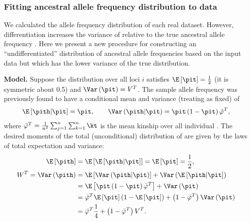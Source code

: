 \documentclass[11pt]{article}
\begin{document}
\subsubsection{Fitting ancestral allele frequency distribution to data}

We calculated the allele frequency distribution \pith of each real dataset.
However, differentiation increases the variance of \pith relative to the true ancestral allele frequency \pit \citep{ochoa_estimating_2021}.
Here we present a new procedure for constructing an ``undifferentiated'' distribution of ancestral allele frequencies based on the input data \pith but which has the lower variance of the true \pit distribution.

\textbf{Model.}
Suppose the \pit distribution over all loci $i$ satisfies $\E \left[ \pit \right] = \frac{1}{2}$ (it is symmetric about 0.5) and $\Var \left( \pit \right) = V^T$.
The sample allele frequency \pith was previously found to have a conditional mean and variance (treating \pit as fixed) of
$$
\E \left[ \pith \middle| \pit \right]
=
\pit
, \quad\quad
\Var \left( \pith \middle| \pit \right)
=
\pit \left( 1 - \pit \right) \bar{\varphi}^T
,
$$
where $\bar{\varphi}^T = \frac{1}{n^2} \sum_{j=1}^n \sum_{k=1}^n \kt$ is the mean kinship over all individual \citep{ochoa_estimating_2021}.
The desired moments of the total (unconditional) distribution of \pith are given by the laws of total expectation and variance:
\begin{align*}
  \E \left[ \pith \right]
  &=
    \E \left[ \E \left[ \pith \middle| \pit \right] \right]
    =
    \E \left[ \pit \right]
    =
    \frac{1}{2}
    , \\
  W^T
  =
  \Var \left( \pith \right)
  &=
    \E \left[ \Var \left( \pith \middle| \pit \right) \right ]
    + \Var \left( \E \left[ \pith \middle| \pit \right] \right)
  \\
  &=
    \E \left[ \pit \left( 1 - \pit \right) \bar{\varphi}^T \right]
    + \Var \left( \pit \right)
  \\
  &=
    \bar{\varphi}^T \E \left[ \pit \right] \left( 1 - \E \left[ \pit \right] \right)
    + \left( 1 - \bar{\varphi}^T \right) \Var \left( \pit \right)
  \\
  &=
    \bar{\varphi}^T \frac{1}{4}
    + \left( 1 - \bar{\varphi}^T \right) V^T
    .
\end{align*}
\end{document}
